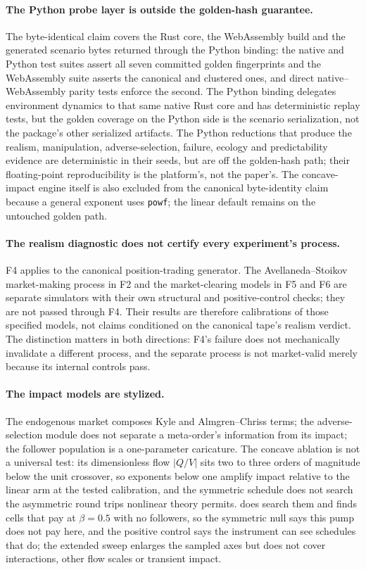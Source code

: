 \paragraph{The Python probe layer is outside the golden-hash guarantee.} The byte-identical claim covers the Rust core, the WebAssembly build and the generated scenario bytes returned through the Python binding: the native and Python test suites assert all seven committed golden fingerprints and the WebAssembly suite asserts the canonical and clustered ones, and direct native--WebAssembly parity tests enforce the second. The Python binding delegates environment dynamics to that same native Rust core and has deterministic replay tests, but the golden coverage on the Python side is the scenario serialization, not the package's other serialized artifacts. The Python reductions that produce the realism, manipulation, adverse-selection, failure, ecology and predictability evidence are deterministic in their seeds, but are off the golden-hash path; their floating-point reproducibility is the platform's, not the paper's. The concave-impact engine itself is also excluded from the canonical byte-identity claim because a general exponent uses \texttt{powf}; the linear default remains on the untouched golden path.

\paragraph{The realism diagnostic does not certify every experiment's process.} F4 applies to the canonical position-trading generator. The Avellaneda--Stoikov market-making process in F2 and the market-clearing models in F5 and F6 are separate simulators with their own structural and positive-control checks; they are not passed through F4. Their results are therefore calibrations of those specified models, not claims conditioned on the canonical tape's realism verdict. The distinction matters in both directions: F4's failure does not mechanically invalidate a different process, and the separate process is not market-valid merely because its internal controls pass.

\paragraph{The impact models are stylized.} The endogenous market composes Kyle and Almgren--Chriss terms; the adverse-selection module does not separate a meta-order's information from its impact; the follower population is a one-parameter caricature. The concave ablation is not a universal test: its dimensionless flow $|Q/V|$ sits two to three orders of magnitude below the unit crossover, so exponents below one amplify impact relative to the linear arm at the tested calibration, and the symmetric schedule does not search the asymmetric round trips nonlinear theory permits.  does search them and finds cells that pay at $\beta = 0.5$ with no followers, so the symmetric null says this pump does not pay here, and the positive control says the instrument can see schedules that do; the extended sweep enlarges the sampled axes but does not cover interactions, other flow scales or transient impact.


